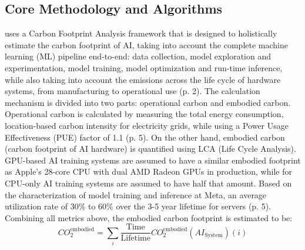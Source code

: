 \documentclass[a4paper, 12pt]{article}
\begin{document}
\subsection{Core Methodology and Algorithms} 
\citet{Wu2022} uses a Carbon Footprint Analysis framework that is designed to holistically estimate the carbon footprint of AI, taking into account the complete machine learning (ML) pipeline end-to-end: data collection, model exploration and experimentation, model training, model optimization and run-time inference, while also taking into account the emissions across the life cycle of hardware systems, from manufacturing to operational use (p. 2). The calculation mechanism is divided into two parts: operational carbon and embodied carbon. Operational carbon is calculated by measuring the total energy consumption, location-based carbon intensity for electricity grids, while using a Power Usage Effectiveness (PUE) factor of 1.1 (p. 5). On the other hand, embodied carbon (carbon footprint of AI hardware) is quantified using LCA (Life Cycle Analysis). GPU-based AI training systems are assumed to have a similar embodied footprint as Apple's 28-core CPU with dual AMD Radeon GPUs in production, while for CPU-only AI training systems are assumed to have half that amount.  Based on the characterization of model training and inference at Meta, an average utilization rate of 30\% to 60\% over the 3-5 year lifetime for servers (p. 5). Combining all metrics above, the embodied carbon footprint is estimated to be: 
\begin{equation}
	CO_2^{\text{embodied}} = \sum_i \frac{\text{Time}}{\text{Lifetime}} CO_2^{\text{embodied}}(AI_{\text{System}})(i)
\end{equation}
\end{document}

